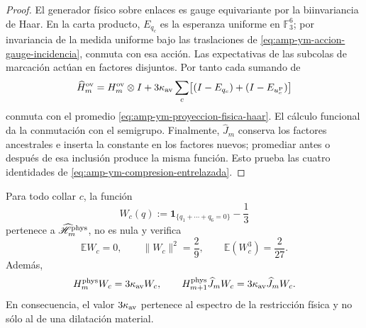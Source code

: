 \begin{proof}
El generador físico sobre enlaces es gauge equivariante por la
biinvariancia de Haar. En la carta producto, \(E_{q_c}\) es la esperanza
uniforme en \(\mathbb F_3^6\); por invariancia de la medida uniforme bajo
las traslaciones de \eqref{eq:amp-ym-accion-gauge-incidencia}, conmuta con
esa acción. Las expectativas de las subcolas de marcación actúan en
factores disjuntos. Por tanto cada sumando de
\[
 \widehat H_m^{\rm ov}
 =H_m^{\rm ov}\otimes I
 +3\kappa_{\rm av}\sum_c
 \bigl[(I-E_{q_c})+(I-E_{u_c^{\rm P}})\bigr]
\]
conmuta con el promedio \eqref{eq:amp-ym-proyeccion-fisica-haar}. El
cálculo funcional da la conmutación con el semigrupo. Finalmente,
\(\widehat J_m\) conserva los factores ancestrales e inserta la constante
en los factores nuevos; promediar antes o después de esa inclusión produce
la misma función. Esto prueba las cuatro identidades de
\eqref{eq:amp-ym-compresion-entrelazada}.
\end{proof}

\begin{lemma}
\label{lem:amp-ym-testigo-fisico-q6}
Para todo collar \(c\), la función
\begin{equation}\label{eq:amp-ym-testigo-fisico-def}
 W_c(q)
 :=\mathbf 1_{\{q_1+\cdots+q_6=0\}}-\frac13
\end{equation}
pertenece a \(\widehat{\mathscr H}_m^{\rm phys}\), no es nula y verifica
\begin{equation}\label{eq:amp-ym-testigo-fisico-momentos}
 \mathbb E W_c=0,\qquad
 \|W_c\|^2=\frac29,\qquad
 \mathbb E(W_c^3)=\frac2{27}.
\end{equation}
Además,
\begin{equation}\label{eq:amp-ym-testigo-fisico-gap}
 H_m^{\rm phys}W_c=3\kappa_{\rm av}W_c,\qquad
 H_{m+1}^{\rm phys}\widehat J_mW_c
 =3\kappa_{\rm av}\widehat J_mW_c.
\end{equation}
En consecuencia, el valor \(3\kappa_{\rm av}\) pertenece al espectro de la
restricción física y no sólo al de una dilatación material.
\end{lemma}

